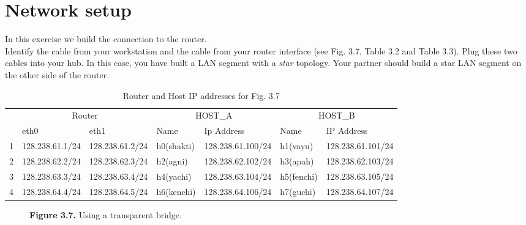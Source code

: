 \documentclass[10pt,a4paper]{article}
\numberwithin{equation}{section}
\numberwithin{figure}{section}
\numberwithin{table}{section}
\begin{document}
\section{Network setup}
    In this exercise we build the connection to the router. \\
    Identify the cable from your workstation and the cable from your router interface (see Fig. 3.7, Table 3.2 and Table 3.3).
    Plug these two cables into your hub.
    In this case, you have built a LAN segment with a \textit{star} topology.
    Your partner should build a star LAN segment on the other side of the router. \\
    \begin{table}[H]
        \caption{Router and Host IP addresses for Fig. 3.7}
        \vspace{5pt}
        \centering
        \large
        \begin{tabular}{ *7l }
            \hline \hline
                & \multicolumn{2}{c}{Router} & \multicolumn{2}{c}{HOST\_A} & \multicolumn{2}{c}{HOST\_B} \\
            & eth0 & eth1 & Name & Ip Address & Name & IP Address \\
            \hline 
            1 & 128.238.61.1/24 & 128.238.61.2/24 & h0(shakti) & 128.238.61.100/24 & h1(vayu) & 128.238.61.101/24 \\
            2 & 128.238.62.2/24 & 128.238.62.3/24 & h2(agni) & 128.238.62.102/24 & h3(apah) & 128.238.62.103/24 \\
            3 & 128.238.63.3/24 & 128.238.63.4/24 & h4(yachi) & 128.238.63.104/24 & h5(fenchi) & 128.238.63.105/24 \\
            4 & 128.238.64.4/24 & 128.238.64.5/24 & h6(kenchi) & 128.238.64.106/24 & h7(guchi) & 128.238.64.107/24 \\
            \hline \hline
            \end{tabular}
    \end{table}

    \begin{figure}[H]
        \centering
        \caption{\textbf{Figure 3.7.} Using a transparent bridge.}        
    \end{figure}
\end{document}
